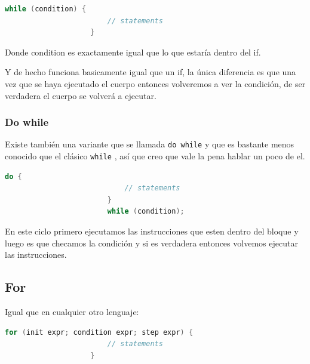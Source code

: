 \documentclass[12pt, fleqn]{report}                             %
\theoremstyle{break}                                            %
\newcommand{\textCode}[1]  { \texttt{#1} }                      %
\begin{document}
                \begin{lstlisting}[language=C++, gobble=20]
                    while (condition) {
                        // statements
                    }
                \end{lstlisting}

                Donde condition es exactamente igual que lo que estaría dentro
                del if.

                Y de hecho funciona basicamente igual que un if, la única diferencia
                es que una vez que se haya ejecutado el cuerpo entonces volveremos a ver la 
                condición, de ser verdadera el cuerpo se volverá a ejecutar.

                \subsubsection{Do while}

                    Existe también una variante que se llamada \textCode{do while} y que 
                    es bastante menos conocido que el clásico \textCode{while}, así que creo
                    que vale la pena hablar un poco de el.

                    \begin{lstlisting}[language=C++, gobble=24]
                        do {
                            // statements
                        }
                        while (condition);
                    \end{lstlisting}

                    En este ciclo primero ejecutamos las instrucciones que esten dentro del bloque
                    y luego es que checamos la condición y si es verdadera entonces volvemos 
                    ejecutar las instrucciones.

            \clearpage
            \subsection{For}

                Igual que en cualquier otro lenguaje:
                \begin{lstlisting}[language=C++, gobble=20]
                    for (init expr; condition expr; step expr) {
                        // statements
                    }
                \end{lstlisting}
\end{document}
